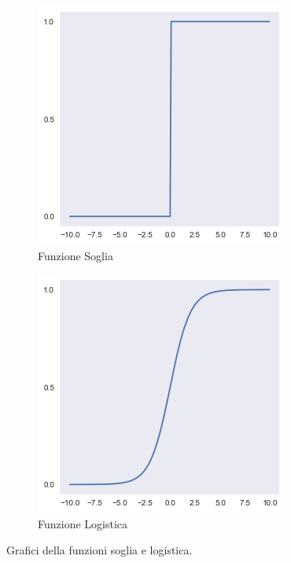 \documentclass[../../main.tex]{subfiles}
\begin{document}
    \begin{figure}[H]
        \begin{subfigure}{0.5\textwidth}
            \centering
            \includegraphics[scale = 0.6]{immagini/4_1/threshold.png} 
            \caption{Funzione Soglia}
            \label{fig:threshold}
        \end{subfigure}
        \begin{subfigure}{0.5\textwidth}
            \centering
            \includegraphics[scale = 0.6]{immagini/4_1/logistic.png}
            \caption{Funzione Logistica}
            \label{fig:logistic}
        \end{subfigure}
        \caption{Grafici della funzioni soglia e logistica.}
    \end{figure}
\end{document}
